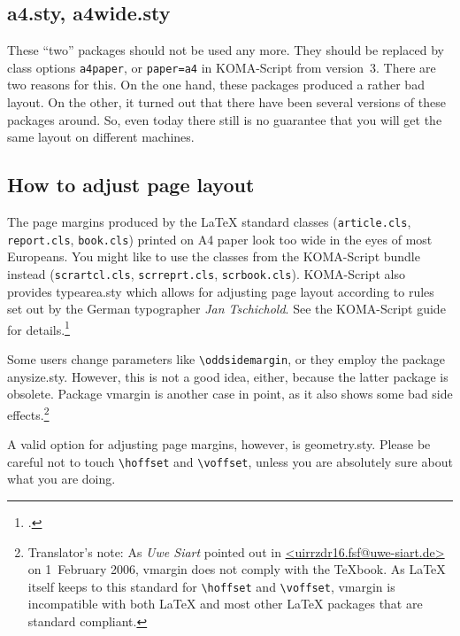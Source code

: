 \documentclass[abstract=on, singlepage=on, paper=a4]{scrartcl}
\newcommand{\Author}[1]{\emph{#1}}
\newcommand{\Command}[1]{\texttt{\textbackslash{}#1}}
\newcommand{\File}[1]{\texttt{#1}}
\newcommand{\Option}[1]{\texttt{#1}}
\newcommand{\Package}[1]{\textsf{#1}}
\begin{document}
\subsection{\Package{a4.sty}, \Package{a4wide.sty}}
\label{sec:a4.sty-a4wide.sty}

These \enquote{two} packages should not be used any more. They should
be replaced by class options \Option{a4paper}, or \Option{paper=a4} in
KOMA-Script from version~3. There are two reasons for this. On the one
hand, these packages produced a rather bad layout. On the other, it
turned out that there have been several versions of these packages
around. So, even today there still is no guarantee that you will get
the same layout on different machines.

\subsection{How to adjust page layout}
\label{sec:adjust-page-layout}

The page margins produced by the \LaTeX{} standard classes
(\File{article.cls}, \File{report.cls}, \File{book.cls}) printed on A4
paper look too wide in the eyes of most Europeans. You might like to
use the classes from the KOMA-Script bundle instead
(\File{scrartcl.cls}, \File{scrreprt.cls},
\File{scrbook.cls}). KOMA-Script also provides \Package{typearea.sty}
which allows for adjusting page layout according to rules set out by
the German typographer \Author{Jan Tschichold}. See the KOMA-Script
guide for details.\footcite{kohm_guide_2018}

Some users change parameters like \Command{oddsidemargin}, or they
employ the package \Package{anysize.sty}. However, this is not a good
idea, either, because the latter package is obsolete. Package
\Package{vmargin} is another case in point, as it also shows some bad
side effects.\footnote{Translator's note: As \Author{Uwe Siart}
  pointed out in \protect\url{<uirrzdr16.fsf@uwe-siart.de>} on
  1~February 2006, \Package{vmargin} does not comply with the
  \TeX{}book. As \LaTeX{} itself keeps to this standard for
  \Command{hoffset} and \Command{voffset}, \Package{vmargin} is
  incompatible with both \LaTeX{} and most other \LaTeX{} packages
  that are standard compliant.}

A valid option for adjusting page margins, however, is
\Package{geometry.sty}. Please be careful not to touch
\Command{hoffset} and \Command{voffset}, unless you are absolutely
sure about what you are doing.
\end{document}
